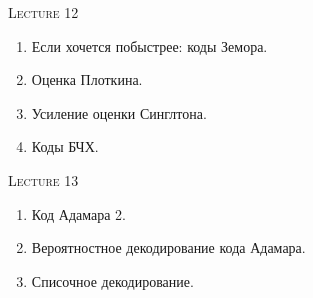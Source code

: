 \centerline{\textsc{Lecture 12}}

\begin{enumerate}
    \item Если хочется побыстрее: коды Земора.
    \item Оценка Плоткина.
    \item Усиление оценки Синглтона.
    \item Коды БЧХ.
\end{enumerate}


\centerline{\textsc{Lecture 13}}

\begin{enumerate}
    \item Код Адамара 2.
    \item Вероятностное декодирование кода Адамара.
    \item Списочное декодирование.
\end{enumerate}
